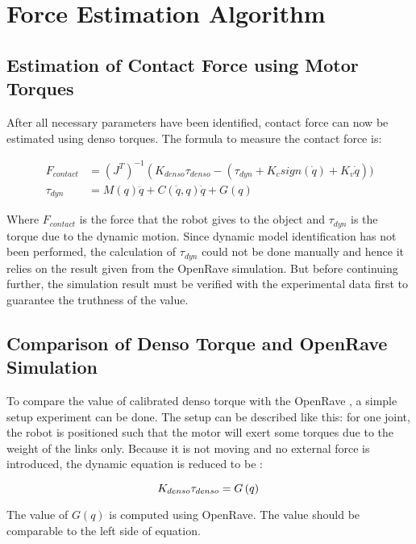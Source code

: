 \chapter{Force Estimation Algorithm}
\section{Estimation of Contact Force using Motor Torques}

After all necessary parameters have been identified, contact force can now be estimated using denso torques. The formula to measure the contact force is:

\begin{align}
\label{model eq}
  F_{contact} &= \left(J^{T}\right)^{-1} \left( K_{denso} \tau_{denso} -  \left( \tau_{dyn} + K_{c} sign\left(\dot{q}\right) + K_{v} \dot{q} \right))\\
  \tau_{dyn} &=M\left(q\right)\ddot{q} + C\left(\dot{q} , q \right)\dot{q} + G\left(q \right)
\end{align}

Where $ F_{contact} $ is the force that the robot gives to the object and $\tau_{dyn}$ is the torque due to the dynamic motion. Since dynamic model identification has not been performed, the calculation of $\tau_{dyn}$ could not be done manually and hence it relies on the result given from the OpenRave simulation. But before continuing further, the simulation result must be verified with the experimental data first to guarantee the truthness of the value. 

\section{Comparison of Denso Torque and OpenRave Simulation}
\label{Verification of Motor Torque Calibration}
To compare the value of calibrated denso torque with the OpenRave , a simple setup experiment can be done. The setup can be described like this: for one joint, the robot is positioned such that the motor will exert some torques due to the weight of the links only. Because it is not moving and no external force is introduced, the dynamic equation is reduced to be :

\begin{equation}
  K_{denso} \tau_{denso} = G\left(q \right) \\
\end{equation}

The value of $G\left(q \right)$ is computed using OpenRave. The value should be comparable to the left side of equation. 

